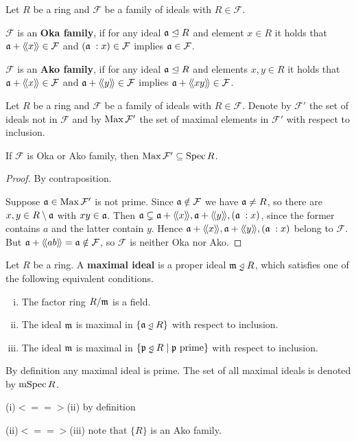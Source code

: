 	\begin{definition}
		Let $R$ be a ring and $\mathcal{F}$ be a family of ideals with $R \in \mathcal{F}$.

		$\mathcal{F}$ is an \textbf{Oka family}, if for any ideal $\mathfrak{a} \trianglelefteq R$ and element $x \in R$ it holds that $\mathfrak{a} + \langle\!\langle x \rangle\!\rangle \in \mathcal{F}$ and $(\mathfrak{a}\;:x) \in \mathcal{F}$ implies $\mathfrak{a} \in \mathcal{F}$.

		$\mathcal{F}$ is an \textbf{Ako family}, if for any ideal $\mathfrak{a} \trianglelefteq R$ and elements $x,y \in R$ it holds that $\mathfrak{a} + \langle\!\langle x \rangle\!\rangle \in \mathcal{F}$ and $\mathfrak{a} + \langle\!\langle y \rangle\!\rangle \in \mathcal{F}$ implies $\mathfrak{a} + \langle\!\langle xy \rangle\!\rangle \in \mathcal{F}$.
	\end{definition}

	\begin{lemma}
		Let $R$ be a ring and $\mathcal{F}$ be a family of ideals with $R \in \mathcal{F}$. Denote by $\mathcal{F}'$ the set of ideals not in $\mathcal{F}$ and by $\operatorname{Max} \mathcal{F}'$ the set of maximal elements in $\mathcal{F}'$ with respect to inclusion.

		If $\mathcal{F}$ is Oka or Ako family, then $\operatorname{Max} \mathcal{F}' \subseteq \operatorname{Spec} R$.
	\end{lemma}
	\begin{proof}
		By contraposition.

		Suppose $\mathfrak{a} \in \operatorname{Max}\mathcal{F}'$ is not prime. Since $\mathfrak{a} \notin \mathcal{F}$ we have $\mathfrak{a} \neq R$, so there are $x,y \in R\setminus \mathfrak{a}$ with $xy \in \mathfrak{a}$. Then $\mathfrak{a} \subsetneq \mathfrak{a} + \langle\!\langle x \rangle\!\rangle, \mathfrak{a}+\langle\!\langle y \rangle\!\rangle, (\mathfrak{a}\;:x)$, since the former contains $a$ and the latter contain $y$. Hence $\mathfrak{a} + \langle\!\langle x \rangle\!\rangle, \mathfrak{a}+\langle\!\langle y \rangle\!\rangle, (\mathfrak{a}\;:x)$ belong to $\mathcal{F}$. But $\mathfrak{a}+\langle\!\langle ab \rangle\!\rangle = \mathfrak{a} \notin \mathcal{F}$, so $\mathcal{F}$ is neither Oka nor Ako.
	\end{proof}

	\begin{definition}
		Let $R$ be a ring. A \textbf{maximal ideal} is a proper ideal $\ideal{m} \divneq R$, which satisfies one of the following equivalent conditions.
		\begin{enumerate}[(i)]
			\item{
				The factor ring $R/\mathfrak{m}$ is a field.
			}
			\item{
				The ideal $\mathfrak{m}$ is maximal in $\{\ideal{a} \divneq R\}$ with respect to inclusion.
			}
			\item{
				The ideal $\mathfrak{m}$ is maximal in $\{\ideal{p} \divneq R \mid \ideal{p} \text{ prime}\}$ with respect to inclusion.
			}
		\end{enumerate}
		By definition any maximal ideal is prime. The set of all maximal ideals is denoted by $\operatorname{mSpec} R$.
	\end{definition}
	\begin{sketch}
		(i)$<==>$(ii) by definition

		(ii)$<==>$(iii) note that $\{R\}$ is an Ako family.
	\end{sketch}

